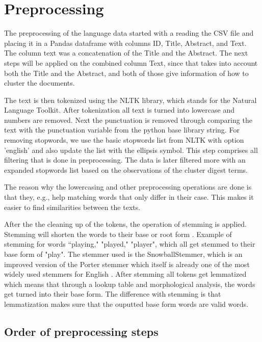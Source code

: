 \section{Preprocessing}

The preprocessing of the language data started with a reading the CSV file and placing it in a Pandas dataframe with columns ID, Title, Abstract, and Text. The column text was a concatenation of the Title and the Abstract. The next steps will be applied on the combined column Text, since that takes into account both the Title and the Abstract, and both of those give information of how to cluster the documents.

The text is then tokenized using the NLTK library, which stands for the Natural Language Toolkit. After tokenization all text is turned into lowercase and numbers are removed. Next the punctuation is removed through comparing the text with the punctuation variable from the python base library string. For removing stopwords, we use the basic stopwords list from NLTK with option 'english' and also update the list with the ellipsis symbol. This step comprises all filtering that is done in preprocessing. The data is later filtered more with an expanded stopwords list based on the observations of the cluster digest terms.



The reason why the lowercasing and other preprocessing operations are done is that they, e.g., help matching words that only differ in their case. This makes it easier to find similarities between the texts.


After the the cleaning up of the tokens, the operation of stemming is applied. Stemming will shorten the words to their base or root form \autocite[pages 431--434]{aggarwal2015data}. Example of stemming for words ``playing," "played," "player", which all get stemmed to their base form of "play". The stemmer used is the SnowballStemmer, which is an improved version of the Porter stemmer which itself is already one of the most widely used stemmers for English \autocite{porter1980algorithm}. After stemming all tokens get lemmatized which means that through a lookup table and morphological analysis, the words get turned into their base form. The difference with stemming is that lemmatization makes sure that the ouputted base form words are valid words.

\subsection{Order of preprocessing steps}

